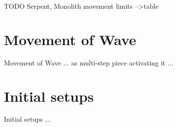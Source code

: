 
\clearpage %

\huge{TODO}
Serpent, Monolith movement limits --\textgreater table
\normalsize{}

\clearpage %

\section*{Movement of Wave}
\label{sec:Appendix/Movement of Wave}

Movement of Wave ... as multi-step piece activating it  ...


\clearpage %

\section*{Initial setups}
\label{sec:Appendix/Initial setups}
Initial setups ...





